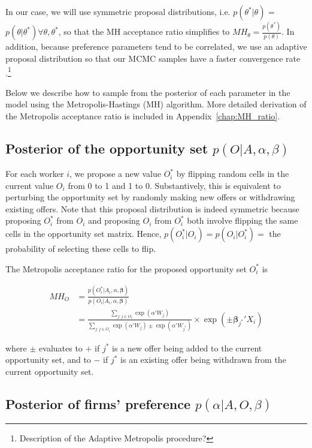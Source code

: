 In our case, we will use symmetric proposal distributions, i.e.
$p(\theta^*|\theta)$ = $p(\theta | \theta^*) \forall \theta, \theta^*$, so that
the MH acceptance ratio simplifies to $MH_{\theta} =
\frac{p(\theta^*)}{p(\theta)}$. In addition, because preference parameters tend
to be correlated, we use an adaptive proposal distribution so that our MCMC
samples have a faster convergence rate \citep{Haario2001}.\footnote{Description
  of the Adaptive Metropolis procedure?}

Below we describe how to sample from the posterior of each parameter in the
model using the Metropolis-Hastings (MH) algorithm. More detailed derivation of the Metropolis acceptance ratio is included
in Appendix~\ref{chap:MH_ratio}.

\subsection{Posterior of the opportunity set $p(O|A, \alpha, \beta)$}

For each worker $i$, we propose a new value $O_i^*$ by flipping random cells in
the current value $O_i$ from 0 to 1 and 1 to 0. Substantively, this is
equivalent to perturbing the opportunity set by randomly making new offers or
withdrawing existing offers. Note that this proposal distribution is indeed
symmetric because proposing $O_i^*$ from $O_i$ and proposing $O_i$ from $O_i^*$
both involve flipping the same cells in the opportunity set matrix. Hence,
$p(O_i^*|O_i) = p(O_i|O_i^*) =$ the probability of selecting these cells to flip.

The Metropolis acceptance ratio for the proposed opportunity set $O_i^*$ is

\begin{align}
  MH_O &= \frac{p(O_i^* | A_i, \alpha, \bm{\beta})}{p(O_i | A_i, \alpha, \bm{\beta})} \\
       &= \frac{\sum\limits_{j:j \in O_i} \exp(\alpha'W_j)}{\sum\limits_{j:j \in O_i} \exp(\alpha'W_j) \pm \exp(\alpha' W_{j^*})} \times \exp(\pm \bm{\beta}_{j^*}'X_i)
\end{align}

where $\pm$ evaluates to $+$ if $j^*$ is a new offer being added to the
current opportunity set, and to $-$ if $j^*$ is an existing offer being withdrawn from
the current opportunity set.

\subsection{Posterior of firms' preference $p(\alpha|A, O, \beta)$}

